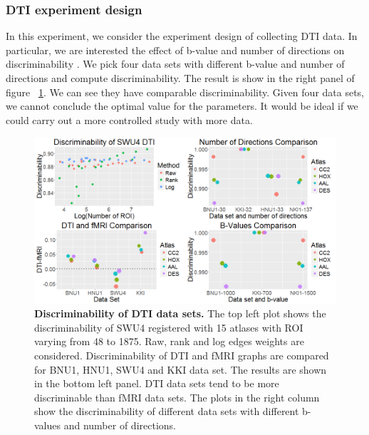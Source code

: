 \documentclass{article}
\begin{document}
\subsubsection{DTI experiment design}
In this experiment, we consider the experiment design of collecting DTI data. In particular, we are interested the effect of b-value and number of directions on discriminability \cite{westin2002processing}. We pick four data sets with different b-value and number of directions and compute discriminability. The result is show in the right panel of figure ~\ref{fig:comb_dti}. We can see they have comparable discriminability. Given four data sets, we cannot conclude the optimal value for the parameters. It would be ideal if we could carry out a more controlled study with more data.

\begin{figure}[H]
	\includegraphics[width=\linewidth]{../Figs/comb_dti.png}
	\caption{{ \bf Discriminability of DTI data sets.} The top left plot shows the discriminability of SWU4 registered with 15 atlases with ROI varying from 48 to 1875. Raw, rank and log edges weights are considered. Discriminability of DTI and fMRI graphs are compared for BNU1, HNU1, SWU4 and KKI data set. The results are shown in the bottom left panel. DTI data sets tend to be more discriminable than fMRI data sets. The plots in the right column show the discriminability of different data sets with different b-values and number of directions.}
	\label{fig:comb_dti}
\end{figure}
\end{document}

